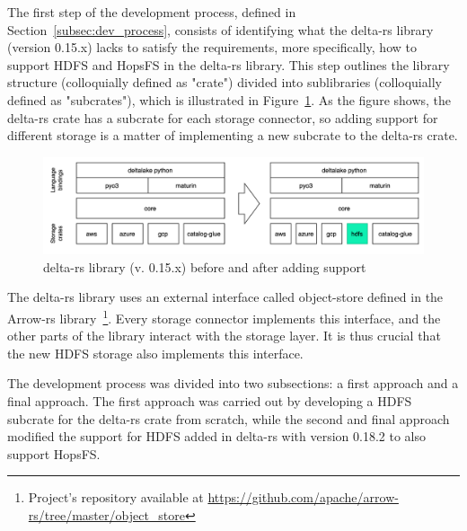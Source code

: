 
The first step of the development process, defined in Section~\ref{subsec:dev_process}, consists of identifying what the delta-rs library (version 0.15.x) lacks to satisfy the requirements, more specifically, how to support \gls{HDFS} and \gls{HopsFS} in the delta-rs library. This step outlines the library structure (colloquially defined as "crate") divided into sublibraries (colloquially defined as "subcrates"), which is illustrated in Figure~\ref{fig:delta-rs_schema}. As the figure shows, the delta-rs crate has a subcrate for each storage connector, so adding support for different storage is a matter of implementing a new subcrate to the delta-rs crate.

\begin{figure}[!ht]
    \begin{center}
      \includegraphics[width=\textwidth]{figures/4-implementation/delta-rs_schema.png}
    \caption{delta-rs library (v. 0.15.x) before and after adding  support}
    \label{fig:delta-rs_schema}
    \end{center}
\end{figure}

The delta-rs library uses an external interface called object-store defined in the Arrow-rs library~\footnote{Project's repository available at \url{https://github.com/apache/arrow-rs/tree/master/object_store}}. Every storage connector implements this interface, and the other parts of the library interact with the storage layer. It is thus crucial that the new \gls{HDFS} storage also implements this interface.

The development process was divided into two subsections: a first approach and a final approach. The first approach was carried out by developing a \gls{HDFS} subcrate for the delta-rs crate from scratch, while the second and final approach modified the support for \gls{HDFS} added in delta-rs with version 0.18.2 to also support \gls{HopsFS}.

